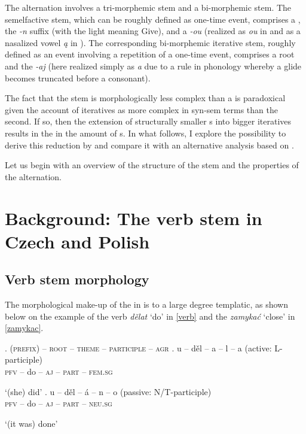The alternation involves a tri-mor\-phe\-mic   stem and a bi-morphemic  stem. The semelfactive stem, which can be roughly defined as one-time event, comprises a , the \textit{-n} suffix (with the light  meaning Give),  and a  \textit{-ou} (realized as \textit{ou} in  and as a nasalized vowel \textit{\k{a}} in ). The corresponding bi-morphemic iterative stem, roughly defined as an event involving a repetition of a one-time event, comprises a root and the  \textit{-aj} (here realized simply as \textit{a} due to a rule in  phonology whereby a glide becomes truncated  before a consonant).
\par
The fact that the  stem is morphologically less complex than a  is paradoxical given the account of iteratives as more complex in syn-sem terms than the second. If so, then the extension of structurally smaller s into bigger iteratives results in the  in the amount of s. In what follows, I explore the possibility to derive this  reduction by  and compare it with an alternative analysis based on . 
\par
Let us begin with an overview of the structure of the   stem and the properties of the  alternation. 

\section{Background: The verb stem in Czech and Polish}

\subsection{Verb stem morphology}

The morphological make-up of the  in  is to a large degree templatic, as shown below on the example of the  verb \textit{d\v elat} `do' in \ref{verb} and the   \textit{zamyka\'c} `close' in \ref{zamykac}.

\ex.\label{verb}	
\textsc{(prefix) -- root -- theme -- participle -- agr} 
\ag.
u -- d\v el -- a -- l -- a (active: L-participle)\label{1a} \\
\textsc{pfv} -- do -- \textsc{aj} -- \textsc{part} -- \textsc{fem.sg} \\
\strut `(she) did' 
\bg. u -- d\v el -- \'a -- n -- o (passive: N/T-participle)\label{1b}\\
\textsc{pfv} -- do -- \textsc{aj} -- \textsc{part} -- \textsc{neu.sg} \\
\strut `(it was) done' 

